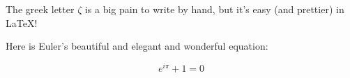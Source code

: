 \documentclass[12pt]{article}
\begin{document}
      The greek letter $\zeta$ is a big pain to write 
      by hand, but it's easy (and prettier) in LaTeX!
     
      Here is Euler's beautiful and elegant and wonderful equation:
     
       
      \begin{equation}
       e^{i\pi} + 1 = 0
      \end{equation}
      

     
\end{document}
